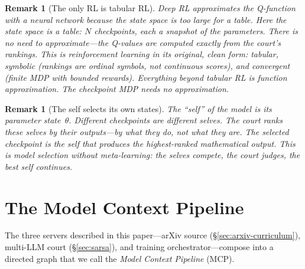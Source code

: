 \documentclass[11pt,a4paper]{article}
\newtheorem{remark}[theorem]{Remark}
\begin{document}
\begin{remark}[The only RL is tabular RL]\label{rem:tabular}
Deep RL approximates the Q-function with a neural network
because the state space is too large for a table.
Here the state space \emph{is} a table: $N$ checkpoints,
each a snapshot of the parameters.
There is no need to approximate---the Q-values are
computed exactly from the court's rankings.
This is reinforcement learning in its original, clean form:
\emph{tabular}, \emph{symbolic} (rankings are ordinal symbols,
not continuous scores), and \emph{convergent}
(finite MDP with bounded rewards).
Everything beyond tabular RL is function approximation.
The checkpoint MDP needs no approximation.
\end{remark}

\begin{remark}[The self selects its own states]
The ``self'' of the model is its parameter state~$\theta$.
Different checkpoints are different selves.
The court ranks these selves by their outputs---by what
they \emph{do}, not what they \emph{are}.
The selected checkpoint is the self that produces the
highest-ranked mathematical output.
This is model selection without meta-learning:
the selves compete, the court judges, the best self continues.
\end{remark}

\section{The Model Context Pipeline}\label{sec:mcp}

The three servers described in this paper---arXiv source
(\S\ref{sec:arxiv-curriculum}), multi-LLM court
(\S\ref{sec:sarsa}), and training orchestrator---compose
into a directed graph that we call the
\emph{Model Context Pipeline} (MCP).
\end{document}
